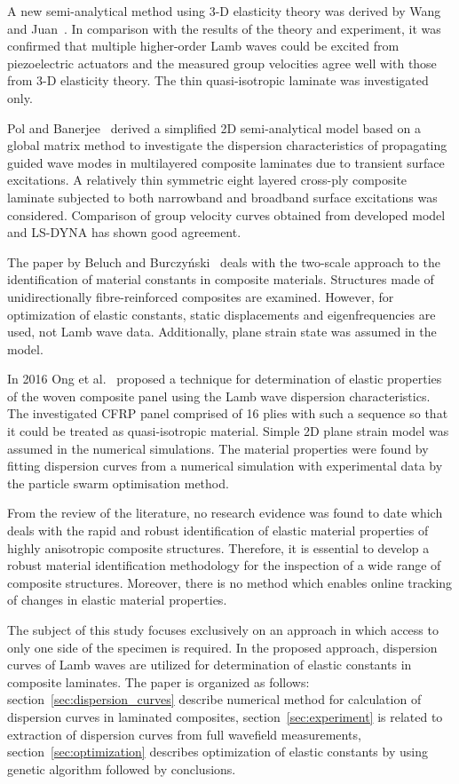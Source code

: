 \documentclass[preprint,12pt]{elsarticle}
\begin{document}
	A new semi-analytical method using 3-D elasticity theory was derived by Wang and Juan~\cite{Wang2007}. In comparison with the results of the theory and experiment, it was confirmed that multiple higher-order Lamb waves could be excited from piezoelectric actuators and the measured group velocities agree well with those from 3-D elasticity theory. The thin quasi-isotropic laminate was investigated only.

	Pol and Banerjee~\cite{Pol2013} derived a simplified 2D semi-analytical model based on a global matrix method to investigate the dispersion characteristics of propagating guided wave modes in multilayered composite laminates due to transient surface excitations. A relatively thin symmetric eight layered cross-ply composite laminate subjected to both narrowband and broadband surface excitations was considered. Comparison of group velocity curves obtained from developed model and LS-DYNA has shown good agreement.

	The paper by Beluch and Burczyński~\cite{Beluch2014} deals with the two-scale approach to the identification of material constants in composite materials. Structures made of unidirectionally fibre-reinforced composites are examined. However, for optimization of elastic constants, static displacements and eigenfrequencies are used, not Lamb wave data. Additionally, plane strain state was assumed in the model.

	In 2016 Ong et al.~\cite{Ong2016} proposed a technique for determination of elastic properties of the woven composite panel using the Lamb wave dispersion characteristics. The investigated CFRP panel comprised of 16 plies with such a sequence so that it could be treated as quasi-isotropic material. Simple 2D plane strain model was assumed in the numerical simulations. The material properties were found by fitting dispersion curves from a numerical simulation with experimental data by the particle swarm optimisation method. 

	From the review of the literature, no research evidence was found to date which deals with the rapid and robust identification of elastic material properties of highly anisotropic composite structures. Therefore, it is essential to develop a robust material identification methodology for the inspection of a wide range of composite structures. Moreover, there is no method which enables online tracking of changes in elastic material properties.

	The subject of this study focuses exclusively on an approach in which access to only one side of the specimen is required. In the proposed approach, dispersion curves of Lamb waves are utilized for determination of elastic constants in composite laminates. The paper is organized as follows: section~\ref{sec:dispersion_curves} describe numerical method for calculation of dispersion curves in laminated composites, section~\ref{sec:experiment} is related to extraction of dispersion curves from full wavefield measurements, section~\ref{sec:optimization} describes optimization of elastic constants by using genetic algorithm followed by conclusions.
\end{document}
